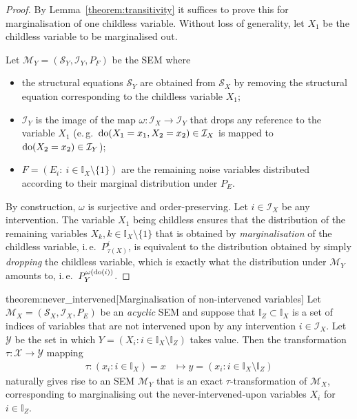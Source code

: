 \begin{proof}
By Lemma~\ref{theorem:transitivity} it suffices to prove this for marginalisation of one childless variable.
Without loss of generality, let $X_1$ be the childless variable to be marginalised out.

Let $\mathcal{M}_Y=(\mathcal{S}_Y,\mathcal{I}_Y,P_F)$ be the SEM where
%
\begin{itemize}
    \item the structural equations $\mathcal{S}_Y$ are obtained from $\mathcal{S}_X$ by removing the structural equation corresponding to the childless variable $X_1$;
    \item $\mathcal{I}_Y$ is the image of the map $\omega:\mathcal{I}_X \to \mathcal{I}_Y$ that drops any reference to the variable $X_1$ (e.\,g.\ ${\operatorname{do}( X_1=x_1, X_2=x_2) \in \mathcal{I}_X}$ is mapped to $\operatorname{do}(X_2=x_2) \in \mathcal{I}_Y$);
    \item $F = (E_i:\ i \in \mathbb{I}_X\setminus\{1\})$ are the remaining noise variables distributed according to their marginal distribution under $P_E$.
\end{itemize}
%
By construction, $\omega$ is surjective and order-preserving.
Let $i\in\mathcal{I}_X$ be any intervention.
The variable $X_1$ being childless ensures that the distribution of the remaining variables $X_k,k\in\mathbb{I}_X\setminus\{1\}$ that is obtained by \emph{marginalisation} of the childless variable, i.\,e.\ $P_{\tau(X)}^{i}$, is equivalent to the distribution obtained by simply \emph{dropping} the childless variable, which is exactly what the distribution under $\mathcal{M}_Y$ amounts to, i.\,e.\ $P_Y^{\omega({\operatorname{do}(i)})}$.
\end{proof}


\medskip


\begin{reptheorem}{theorem:never_intervened}[Marginalisation of non-intervened variables]
Let $\mathcal{M}_X=(\mathcal{S}_X,\mathcal{I}_X,P_E)$ be an \emph{acyclic} SEM and suppose that ${\mathbb{I}_Z\subset\mathbb{I}_X}$ is a set of indices of variables that are not intervened upon by any intervention $i\in\mathcal{I}_X$.
Let $\mathcal{Y}$ be the set in which $Y = \left( X_i: i\in\mathbb{I}_X\setminus \mathbb{I}_Z \right)$ takes value.
Then the transformation $\tau: \mathcal{X} \to \mathcal{Y}$ mapping
\begin{align*}
   \tau: \left( x_i: i\in\mathbb{I}_X \right) = x &\mapsto y = \left( x_i: i\in\mathbb{I}_X\setminus \mathbb{I}_Z \right)
\end{align*}
naturally gives rise to an SEM $\mathcal{M}_Y$ that is an exact $\tau$-transformation of $\mathcal{M}_X$, corresponding to marginalising out the never-intervened-upon variables $X_i$ for $i\in\mathbb{I}_Z$.
\end{reptheorem}

